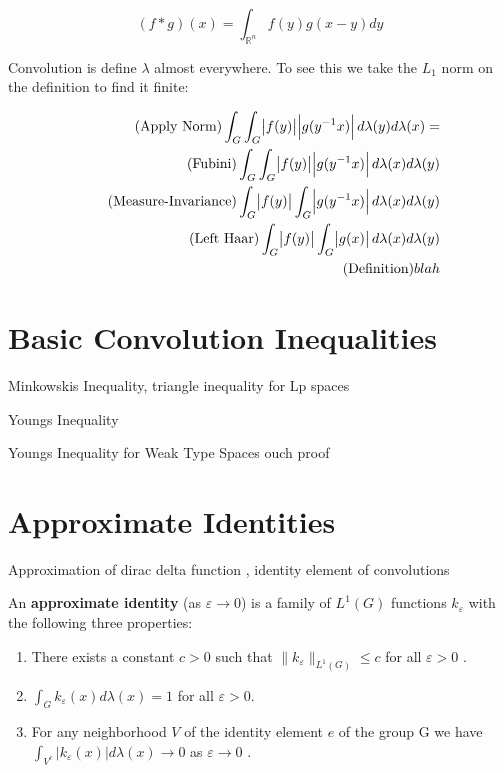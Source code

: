 \begin{equation}
 (f*g)(x) = \int_{\mathbb{R}^n} f(y)g(x-y) dy
\end{equation}

\begin{theorem}
Convolution is define $\lambda$ almost everywhere. To see this we take the $L_1$ norm on the definition to find it finite:

\begin{align*}
\tag{Apply Norm}
 \int_G \int_G \abs{f(y)} \abs{g(y^{-1}x)} d\lambda(y) d\lambda(x) = \\
 \tag{Fubini}
 \int_G \int_G \abs{f(y)} \abs{g(y^{-1}x)} d\lambda(x) d\lambda(y) \\
 \tag{Measure-Invariance}
 \int_G \abs{f(y)} \int_G  \abs{g(y^{-1}x)} d\lambda(x) d\lambda(y) \\
 \tag{Left Haar}
 \int_G \abs{f(y)} \int_G  \abs{g(x)} d\lambda(x) d\lambda(y) \\
 \tag{Definition}
 blah \\
\end{align*}

\end{theorem}

\section{Basic Convolution Inequalities}


\begin{theorem}
Minkowskis Inequality, triangle inequality for Lp spaces
\end{theorem}

\begin{theorem}
Youngs Inequality
\end{theorem}


\begin{theorem}
Youngs Inequality for Weak Type Spaces
ouch proof
\end{theorem}

\section{Approximate Identities}

Approximation of dirac delta function , identity element of convolutions

\begin{definition}
An \textbf{approximate identity} (as $\varepsilon \rightarrow 0$) is a family of $L^1(G)$ functions $k_\varepsilon$ with the following three properties: 
\begin{enumerate}[label=(\roman*)]
\item There exists a constant $c > 0$ such that $\| k_\varepsilon \| _ {L^1(G)} \leqslant c$ for all $ \varepsilon > 0 $ . 
\item $ \int_G k_\varepsilon(x) d\lambda(x) = 1$ for all $\varepsilon > 0 $.
\item For any neighborhood $V$ of the identity element $e$ of the group G we have $ \int_{V^c} | k_\varepsilon(x) | d \lambda(x) \rightarrow 0  $ as $ \varepsilon \rightarrow 0 $ . 
\end{enumerate}
\end{definition}

